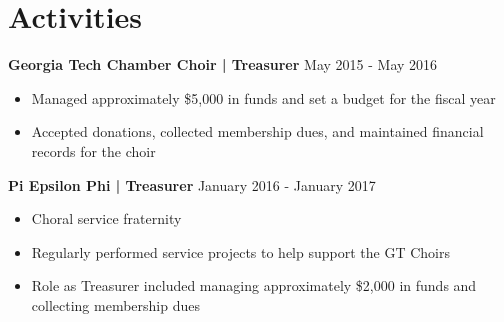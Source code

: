 \documentclass[10pt]{article}
\newcommand{\pipe}{| }
\begin{document}
\section*{Activities}
\textbf{Georgia Tech Chamber Choir \pipe Treasurer} \hfill May 2015 - May 2016
\begin{itemize}
    \item Managed approximately \$5,000 in funds and set a budget for the fiscal year
    \item Accepted donations, collected membership dues, and maintained financial records for the choir
\end{itemize}

\vspace{3pt}

\textbf{Pi Epsilon Phi \pipe Treasurer} \hfill January 2016 - January 2017
\begin{itemize}
    \item Choral service fraternity
    \item Regularly performed service projects to help support the GT Choirs
    \item Role as Treasurer included managing approximately \$2,000 in funds and collecting membership dues
\end{itemize}
\end{document}

